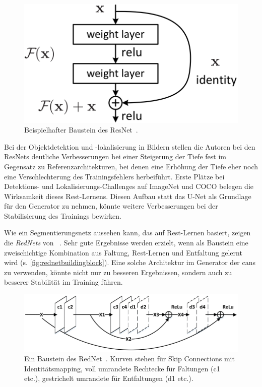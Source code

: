 \begin{figure}
	\centering
	\includegraphics[width=0.5\linewidth]{img/resnet_building_block}
	\caption[Beispielhafter Baustein des ResNet]{Beispielhafter Baustein des ResNet~\cite{He.2016}.}
	\label{fig:resnetbuildingblock}
\end{figure}

Bei der Objektdetektion und -lokalisierung in Bildern stellen die Autoren bei den ResNets deutliche Verbesserungen bei einer Steigerung der Tiefe fest im Gegensatz zu Referenzarchitekturen, bei denen eine Erhöhung der Tiefe eher noch eine Verschlechterung des Trainingsfehlers herbeiführt.
Erste Plätze bei Detektions- und Lokalisierungs-Challenges auf ImageNet und COCO belegen die Wirksamkeit dieses Rest-Lernens.
Diesen Aufbau statt das U-Net als Grundlage für den Generator zu nehmen, könnte weitere Verbesserungen bei der Stabilisierung des Trainings bewirken.

Wie ein Segmentierungsnetz aussehen kann, das auf Rest-Lernen basiert, zeigen die \emph{RedNets} von \citeauthor{Mao.2016}~\cite{Mao.2016}.
Sehr gute Ergebnisse werden erzielt, wenn als Baustein eine zweischichtige Kombination aus Faltung, Rest-Lernen und Entfaltung gelernt wird (s. \autoref{fig:rednetbuildingblock}).
Eine solche Architektur im Generator der \glspl{can} zu verwenden, könnte nicht nur zu besseren Ergebnissen, sondern auch zu besserer Stabilität im Training führen.

\begin{figure}
	\centering
	\includegraphics[width=0.8\linewidth]{img/rednet_building_block}
	\caption[Ein Baustein des RedNet]{Ein Baustein des RedNet~\cite{Mao.2016}. Kurven stehen für Skip Connections mit Identitätsmapping, voll umrandete Rechtecke für Faltungen (c1 etc.), gestrichelt umrandete für Entfaltungen (d1 etc.).}
	\label{fig:rednetbuildingblock}
\end{figure}



